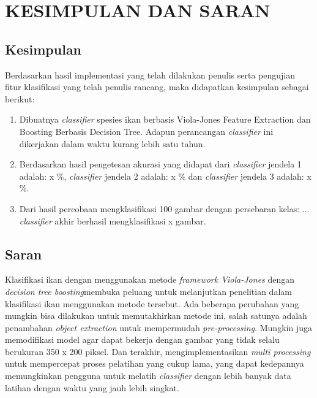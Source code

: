 
\chapter{KESIMPULAN DAN SARAN}

\section{Kesimpulan}
Berdasarkan hasil implementasi yang telah dilakukan penulis serta pengujian fitur klasifikasi yang 
telah penulis rancang, maka didapatkan kesimpulan sebagai berikut:

\begin{enumerate}
	\item Dibuatnya \textit{classifier} spesies ikan berbasis Viola-Jones Feature Extraction dan Boosting
	Berbasis Decision Tree. Adapun perancangan \textit{classifier} ini dikerjakan dalam 
	waktu kurang lebih satu tahun.

	\item Berdasarkan hasil pengetesan akurasi yang didapat dari \textit{classifier} jendela 1 adalah: 
	x \%, \textit{classifier} jendela 2 adalah: x \% dan \textit{classifier} jendela 3 adalah: x \%.

	\item Dari hasil percobaan mengklasifikasi 100 gambar dengan persebaran kelas: ... 
	\textit{classifier} akhir berhasil mengklasifikasi x gambar.
	
\end{enumerate}

\section{Saran}
	Klasifikasi ikan dengan menggunakan metode \textit{framework Viola-Jones} dengan 
	\textit{decision tree boosting}membuka peluang untuk melanjutkan penelitian 
	dalam klasifikasi ikan menggunakan metode tersebut. Ada beberapa perubahan yang mungkin 
	bisa dilakukan untuk memutakhirkan metode ini, salah satunya adalah penambahan 
	\textit{object extraction} untuk mempermudah \textit{pre-processing}. Mungkin 
	juga memodifikasi model agar dapat bekerja dengan gambar yang tidak selalu berukuran 
	350 x 200 piksel. Dan terakhir, mengimplementasikan \textit{multi processing} untuk 
	mempercepat proses pelatihan yang cukup lama, yang dapat kedepannya memungkinkan pengguna 
	untuk melatih \textit{classifier} dengan lebih banyak data latihan dengan waktu yang jauh lebih singkat.


\begin{comment}

\end{comment}
